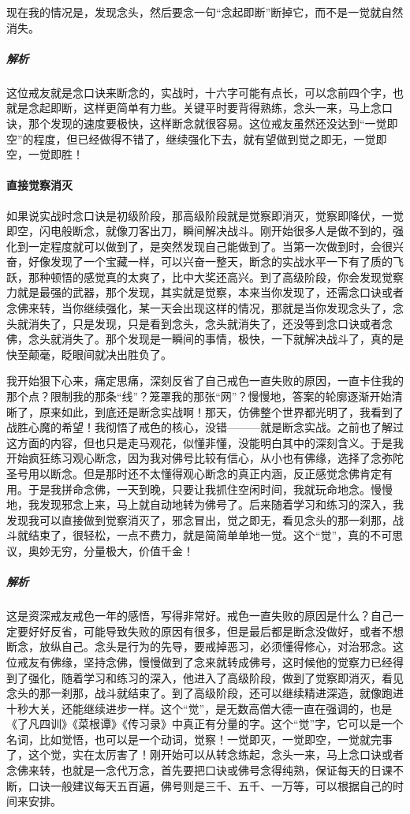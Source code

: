 \begin{case}[实战时念口诀]
    现在我的情况是，发现念头，然后要念一句“念起即断”断掉它，而不是一觉就自然消失。
    \subparagraph{解析} 这位戒友就是念口诀来断念的，实战时，十六字可能有点长，可以念前四个字，也就是念起即断，这样更简单有力些。关键平时要背得熟练，念头一来，马上念口诀，那个发现的速度要极快，这样断念就很容易。这位戒友虽然还没达到“一觉即空”的程度，但已经做得不错了，继续强化下去，就有望做到觉之即无，一觉即空，一觉即胜！
\end{case}

\paragraph{直接觉察消灭}

如果说实战时念口诀是初级阶段，那高级阶段就是觉察即消灭，觉察即降伏，一觉即空，闪电般断念，就像刀客出刀，瞬间解决战斗。刚开始很多人是做不到的，强化到一定程度就可以做到了，是突然发现自己能做到了。当第一次做到时，会很兴奋，好像发现了一个宝藏一样，可以兴奋一整天，断念的实战水平一下有了质的飞跃，那种顿悟的感觉真的太爽了，比中大奖还高兴。到了高级阶段，你会发现觉察力就是最强的武器，那个发现，其实就是觉察，本来当你发现了，还需念口诀或者念佛来转，当你继续强化，某一天会出现这样的情况，那就是当你发现念头了，念头就消失了，只是发现，只是看到念头，念头就消失了，还没等到念口诀或者念佛，念头就消失了。那个发现是一瞬间的事情，极快，一下就解决战斗了，真的是快至颠毫，眨眼间就决出胜负了。

\begin{case}[直接觉察消灭]
    我开始狠下心来，痛定思痛，深刻反省了自己戒色一直失败的原因，一直卡住我的那个点？限制我的那条“线”？笼罩我的那张“网”？慢慢地，答案的轮廓逐渐开始清晰了，原来如此，到底还是断念实战啊！那天，仿佛整个世界都光明了，我看到了战胜心魔的希望！我彻悟了戒色的核心，没错———就是断念实战。之前也了解过这方面的内容，但也只是走马观花，似懂非懂，没能明白其中的深刻含义。于是我开始疯狂练习观心断念，因为我对佛号比较有信心，从小也有佛缘，选择了念弥陀圣号用以断念。但是那时还不太懂得观心断念的真正内涵，反正感觉念佛肯定有用。于是我拼命念佛，一天到晚，只要让我抓住空闲时间，我就玩命地念。慢慢地，我发现邪念上来，马上就自动地转为佛号了。后来随着学习和练习的深入，我发现我可以直接做到觉察消灭了，邪念冒出，觉之即无，看见念头的那一刹那，战斗就结束了，很轻松，一点不费力，就是简简单单地一觉。这个“觉”，真的不可思议，奥妙无穷，分量极大，价值千金！
    \subparagraph{解析} 这是资深戒友戒色一年的感悟，写得非常好。戒色一直失败的原因是什么？自己一定要好好反省，可能导致失败的原因有很多，但是最后都是断念没做好，或者不想断念，放纵自己。念头是行为的先导，要戒掉恶习，必须懂得修心，对治邪念。这位戒友有佛缘，坚持念佛，慢慢做到了念来就转成佛号，这时候他的觉察力已经得到了强化，随着学习和练习的深入，他进入了高级阶段，做到了觉察即消灭，看见念头的那一刹那，战斗就结束了。到了高级阶段，还可以继续精进深造，就像跑进十秒大关，还能继续进步一样。这个“觉”，是无数高僧大德一直在强调的，也是《了凡四训》《菜根谭》《传习录》中真正有分量的字。这个“觉”字，它可以是一个名词，比如觉悟，也可以是一个动词，觉察！一觉即灭，一觉即空，一觉就完事了，这个觉，实在太厉害了！刚开始可以从转念练起，念头一来，马上念口诀或者念佛来转，也就是一念代万念，首先要把口诀或佛号念得纯熟，保证每天的日课不断，口诀一般建议每天五百遍，佛号则是三千、五千、一万等，可以根据自己的时间来安排。
\end{case}

